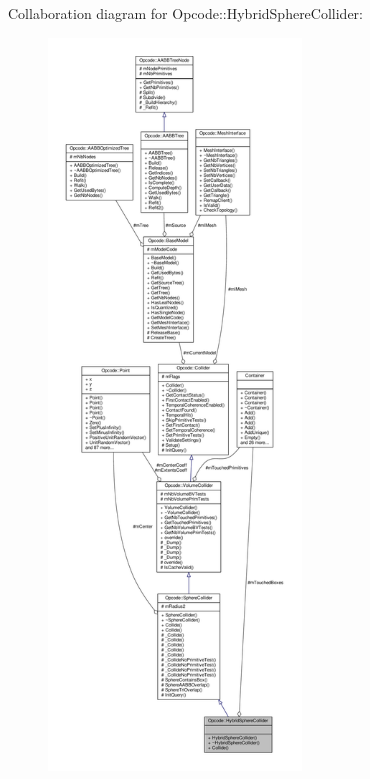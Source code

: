 Collaboration diagram for Opcode\+:\+:Hybrid\+Sphere\+Collider\+:
\nopagebreak
\begin{figure}[H]
\begin{center}
\leavevmode
\includegraphics[height=550pt]{db/d2b/classOpcode_1_1HybridSphereCollider__coll__graph}
\end{center}
\end{figure}
